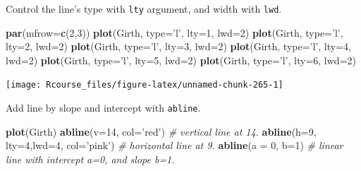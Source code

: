 \documentclass[]{book}
\newenvironment{Shaded}{\begin{snugshade}}{\end{snugshade}}
\newcommand{\KeywordTok}[1]{\textcolor[rgb]{0.13,0.29,0.53}{\textbf{#1}}}
\newcommand{\DataTypeTok}[1]{\textcolor[rgb]{0.13,0.29,0.53}{#1}}
\newcommand{\DecValTok}[1]{\textcolor[rgb]{0.00,0.00,0.81}{#1}}
\newcommand{\StringTok}[1]{\textcolor[rgb]{0.31,0.60,0.02}{#1}}
\newcommand{\CommentTok}[1]{\textcolor[rgb]{0.56,0.35,0.01}{\textit{#1}}}
\newcommand{\NormalTok}[1]{#1}
\theoremstyle{definition}
\theoremstyle{definition}
\theoremstyle{definition}
\theoremstyle{remark}
\begin{document}
Control the line's type with \texttt{lty} argument, and width with
\texttt{lwd}.

\begin{Shaded}
\begin{Highlighting}[]
\KeywordTok{par}\NormalTok{(}\DataTypeTok{mfrow=}\KeywordTok{c}\NormalTok{(}\DecValTok{2}\NormalTok{,}\DecValTok{3}\NormalTok{))}
\KeywordTok{plot}\NormalTok{(Girth, }\DataTypeTok{type=}\StringTok{'l'}\NormalTok{, }\DataTypeTok{lty=}\DecValTok{1}\NormalTok{, }\DataTypeTok{lwd=}\DecValTok{2}\NormalTok{)}
\KeywordTok{plot}\NormalTok{(Girth, }\DataTypeTok{type=}\StringTok{'l'}\NormalTok{, }\DataTypeTok{lty=}\DecValTok{2}\NormalTok{, }\DataTypeTok{lwd=}\DecValTok{2}\NormalTok{)}
\KeywordTok{plot}\NormalTok{(Girth, }\DataTypeTok{type=}\StringTok{'l'}\NormalTok{, }\DataTypeTok{lty=}\DecValTok{3}\NormalTok{, }\DataTypeTok{lwd=}\DecValTok{2}\NormalTok{)}
\KeywordTok{plot}\NormalTok{(Girth, }\DataTypeTok{type=}\StringTok{'l'}\NormalTok{, }\DataTypeTok{lty=}\DecValTok{4}\NormalTok{, }\DataTypeTok{lwd=}\DecValTok{2}\NormalTok{)}
\KeywordTok{plot}\NormalTok{(Girth, }\DataTypeTok{type=}\StringTok{'l'}\NormalTok{, }\DataTypeTok{lty=}\DecValTok{5}\NormalTok{, }\DataTypeTok{lwd=}\DecValTok{2}\NormalTok{)}
\KeywordTok{plot}\NormalTok{(Girth, }\DataTypeTok{type=}\StringTok{'l'}\NormalTok{, }\DataTypeTok{lty=}\DecValTok{6}\NormalTok{, }\DataTypeTok{lwd=}\DecValTok{2}\NormalTok{)}
\end{Highlighting}
\end{Shaded}

\texttt{[image: Rcourse\_files/figure-latex/unnamed-chunk-265-1]}

Add line by slope and intercept with \texttt{abline}.

\begin{Shaded}
\begin{Highlighting}[]
\KeywordTok{plot}\NormalTok{(Girth)}
\KeywordTok{abline}\NormalTok{(}\DataTypeTok{v=}\DecValTok{14}\NormalTok{, }\DataTypeTok{col=}\StringTok{'red'}\NormalTok{) }\CommentTok{# vertical line at 14.}
\KeywordTok{abline}\NormalTok{(}\DataTypeTok{h=}\DecValTok{9}\NormalTok{, }\DataTypeTok{lty=}\DecValTok{4}\NormalTok{,}\DataTypeTok{lwd=}\DecValTok{4}\NormalTok{, }\DataTypeTok{col=}\StringTok{'pink'}\NormalTok{) }\CommentTok{# horizontal line at 9.}
\KeywordTok{abline}\NormalTok{(}\DataTypeTok{a =} \DecValTok{0}\NormalTok{, }\DataTypeTok{b=}\DecValTok{1}\NormalTok{) }\CommentTok{# linear line with intercept a=0, and slope b=1.}
\end{Highlighting}
\end{Shaded}
\end{document}
